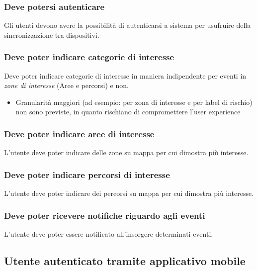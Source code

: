 \documentclass{article}
\begin{document}
\subsubsection{Deve potersi autenticare}
\label{5.1.6}
Gli utenti devono avere la possibilità di autenticarsi a sistema per usufruire della sincronizzazione tra dispositivi.

\subsubsection{Deve poter indicare categorie di interesse}
\label{5.1.7}
Deve poter indicare categorie di interesse in maniera indipendente per eventi in \textit{zone di interesse} (Aree e percorsi) e non.
\begin{itemize}
    \item Granularità maggiori (ad esempio: per zona di interesse e per label di rischio) non sono previste, in quanto rischiano di compromettere l'user experience
\end{itemize}

\subsubsection{Deve poter indicare aree di interesse}
\label{5.1.8}
L'utente deve poter indicare delle zone su mappa per cui dimostra più interesse.

\subsubsection{Deve poter indicare percorsi di interesse}
\label{5.1.9}
L'utente deve poter indicare dei percorsi su mappa per cui dimostra più interesse.

\subsubsection{Deve poter ricevere notifiche riguardo agli eventi}
\label{5.1.10}
L'utente deve poter essere notificato all'insorgere determinati eventi.

\subsection{Utente autenticato tramite applicativo mobile}
\end{document}

